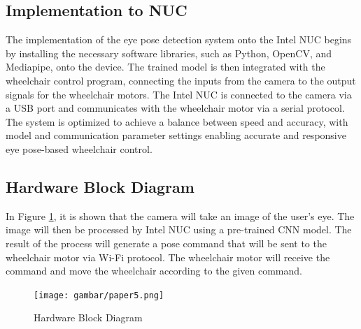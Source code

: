 \subsection{Implementation to NUC}

The implementation of the eye pose detection system onto the Intel NUC begins by installing the necessary software libraries, such as Python, OpenCV, and Mediapipe, onto the device. The trained model is then integrated with the wheelchair control program, connecting the inputs from the camera to the output signals for the wheelchair motors. The Intel NUC is connected to the camera via a USB port and communicates with the wheelchair motor via a serial protocol. The system is optimized to achieve a balance between speed and accuracy, with model and communication parameter settings enabling accurate and responsive eye pose-based wheelchair control.

\subsection{Hardware Block Diagram}

In Figure \ref{fig:aluralat}, it is shown that the camera will take an image of the user's eye. The image will then be processed by Intel NUC using a pre-trained CNN model. The result of the process will generate a pose command that will be sent to the wheelchair motor via Wi-Fi protocol. The wheelchair motor will receive the command and move the wheelchair according to the given command.

\begin{figure} [ht] \centering
  \texttt{[image: gambar/paper5.png]}
  \caption{Hardware Block Diagram}
  \label{fig:aluralat}
\end{figure}